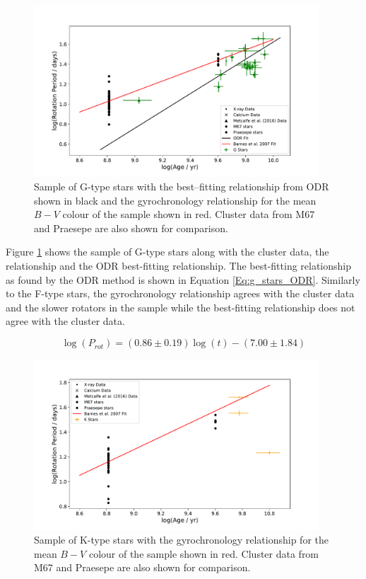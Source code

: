 \begin{figure}[!hbt]
    \centering
    \includegraphics[width=0.95\textwidth]{Figures/5-Activity_rotation/g_prot_v_age.pdf}
    \caption{Sample of G-type stars with the best--fitting relationship from ODR shown in black and the \citet{Barnes_2007} gyrochronology relationship for the mean $B-V$ colour of the sample shown in red. Cluster data from M67 and Praesepe are also shown for comparison.}
    \label{fig:g_prot_v_age}
\end{figure}

Figure \ref{fig:g_prot_v_age} shows the sample of G-type stars along with the cluster data, the \citet{Barnes_2007} relationship and the ODR best-fitting relationship. The best-fitting relationship as found by the ODR method is shown in Equation \ref{Eq:g_stars_ODR}. Similarly to the F-type stars, the gyrochronology relationship agrees with the cluster data and the slower rotators in the sample while the best-fitting relationship does not agree with the cluster data.


\begin{equation}
    \log(P_{rot}) = (0.86 \pm 0.19)\log(t) - (7.00 \pm 1.84)
    \label{Eq:g_stars_ODR}
\end{equation}

\begin{figure}[h!]
    \centering
    \includegraphics[width=0.95\textwidth]{Figures/5-Activity_rotation/k_prot_v_age.pdf}
    \caption{Sample of K-type stars with the \citet{Barnes_2007} gyrochronology relationship for the mean $B-V$ colour of the sample shown in red. Cluster data from M67 and Praesepe are also shown for comparison.}
    \label{fig:k_prot_v_age}
\end{figure}

